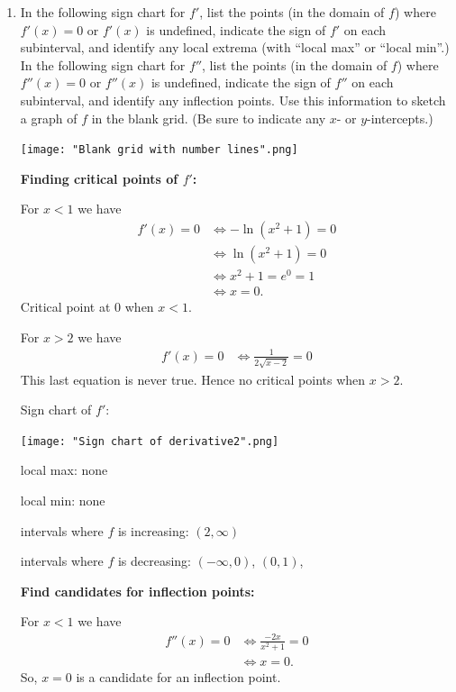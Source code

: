 \documentclass[nooutcomes]{ximera}
\begin{document}
\begin{problem}
\begin{enumerate}
    \item
      In the following sign chart for $f'$, list the points (in the domain of $f$) where $f'(x) = 0$ or $f'(x)$ is undefined, indicate the sign of $f'$ on each subinterval, and identify any local extrema (with ``local max'' or ``local min''.)
      In the following sign chart for $f''$, list the points (in the domain of $f$) where $f''(x) = 0$ or $f''(x)$ is undefined, indicate the sign of $f''$ on each subinterval, and identify any inflection points.
      Use this information to sketch a graph of $f$ in the blank grid.
      (Be sure to indicate any $x$- or $y$-intercepts.)
        \begin{image}
          \texttt{[image: "Blank grid with number lines".png]}
        \end{image}
        
           \begin{freeResponse}
        \textbf{Finding critical points of $f'$:}

        For $x < 1$ we have
        \begin{align*}
          f'(x) = 0 &\iff -\ln(x^2+1) = 0 \\
          &\iff \ln(x^2+1) = 0\\
          &\iff x^2 + 1 = e^0 = 1\\
          &\iff x = 0.
        \end{align*}
        Critical point at $0$ when $x < 1$.

        For $x > 2$ we have
        \begin{align*}
          f'(x) = 0 &\iff \frac{1}{2\sqrt{x-2}} = 0
        \end{align*}
        This last equation is never true.
        Hence no critical points when $x > 2$.

        Sign chart of $f'$:
        \begin{image}
          \texttt{[image: "Sign chart of derivative2".png]}
        \end{image}
        
        local max: none
        
        local min: none

        intervals where $f$ is increasing: $(2, \infty)$

        intervals where $f$ is decreasing: $(-\infty, 0)$, $(0, 1)$, 

        \textbf{Find candidates for inflection points:}

        For $x < 1$ we have
        \begin{align*}
          f''(x) = 0 &\iff \frac{-2x}{x^2+1} = 0\\
          &\iff x = 0.
        \end{align*}
        So, $x=0$ is a candidate for an inflection point. 


\end{freeResponse}
\end{enumerate}
\end{problem}
\end{document}

